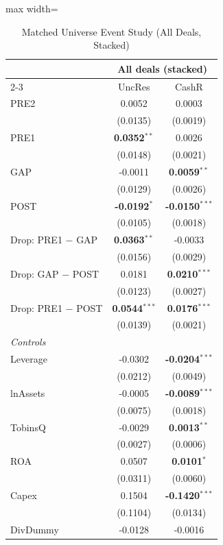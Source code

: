 \begin{table}[htbp]\centering
\caption{Matched Universe Event Study (All Deals, Stacked)}\label{tab:rob_timing_matched}
\scriptsize\begin{adjustbox}{max width=\linewidth}\begin{tabular}{lcc}
\toprule
 & \multicolumn{2}{c}{\textbf{All deals (stacked)}} \\
\cmidrule(lr){2-3}
 & UncRes & CashR \\
\midrule




PRE2 & 0.0052 & 0.0003  \\
 & (0.0135) & (0.0019)  \\
PRE1 & \textbf{0.0352}$^{**}$ & 0.0026  \\
 & (0.0148) & (0.0021)  \\
GAP & -0.0011 & \textbf{0.0059}$^{**}$  \\
 & (0.0129) & (0.0026)  \\
POST & \textbf{-0.0192}$^{*}$ & \textbf{-0.0150}$^{***}$  \\
 & (0.0105) & (0.0018)  \\
\midrule
Drop: PRE1 $-$ GAP & \textbf{0.0363}$^{**}$ & -0.0033  \\
 & (0.0156) & (0.0029)  \\
Drop: GAP $-$ POST & 0.0181 & \textbf{0.0210}$^{***}$  \\
 & (0.0123) & (0.0027)  \\
Drop: PRE1 $-$ POST & \textbf{0.0544}$^{***}$ & \textbf{0.0176}$^{***}$  \\
 & (0.0139) & (0.0021)  \\
\midrule\multicolumn{3}{l}{\textit{Controls}} \\
Leverage & -0.0302 & \textbf{-0.0204}$^{***}$  \\
 & (0.0212) & (0.0049)  \\
lnAssets & -0.0005 & \textbf{-0.0089}$^{***}$  \\
 & (0.0075) & (0.0018)  \\
TobinsQ & -0.0029 & \textbf{0.0013}$^{**}$  \\
 & (0.0027) & (0.0006)  \\
ROA & 0.0507 & \textbf{0.0101}$^{*}$  \\
 & (0.0311) & (0.0060)  \\
Capex & 0.1504 & \textbf{-0.1420}$^{***}$  \\
 & (0.1104) & (0.0134)  \\
DivDummy & -0.0128 & -0.0016  \\

\end{tabular}
\end{adjustbox}
\end{table}
